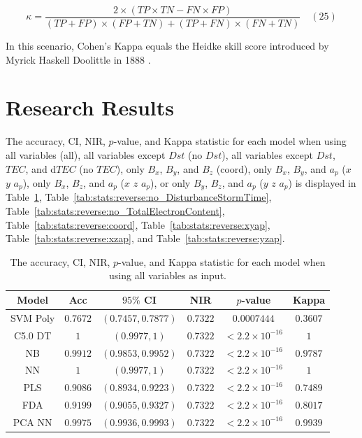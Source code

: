 \documentclass[sn-mathphys-num]{sn-jnl}%
\begin{document}
\begin{equation}
	\kappa ={\frac{2\times (TP\times TN-FN\times FP)}{(TP+FP)\times (FP+TN)+(TP+FN)\times (FN+TN)}}
	\quad\left(25\right)
\end{equation}

In this scenario, Cohen's Kappa equals the Heidke skill score introduced by Myrick Haskell Doolittle in 1888 \cite{heidke1926berechnung, philosophical1887bulletin}.

\section{Research Results}
\label{sec:Results}

The accuracy, CI, NIR, $p$-value, and Kappa statistic for each model when using all variables (all), all variables except $Dst$ (no $Dst$), all variables except $Dst$, $TEC$, and d$TEC$ (no $TEC$), only $B_{x}$, $B_{y}$, and $B_{z}$ (coord), only $B_{x}$, $B_{y}$, and $a_{p}$ ($x$ $y$ $a_{p}$), only $B_{x}$, $B_{z}$, and $a_{p}$ ($x$ $z$ $a_{p}$), or only $B_{y}$, $B_{z}$, and $a_{p}$ ($y$ $z$ $a_{p}$) is displayed in Table~\ref{tab:stats:reverse:all}, Table~\ref{tab:stats:reverse:no_DisturbanceStormTime}, Table~\ref{tab:stats:reverse:no_TotalElectronContent}, Table~\ref{tab:stats:reverse:coord}, Table~\ref{tab:stats:reverse:xyap}, Table~\ref{tab:stats:reverse:xzap}, and Table~\ref{tab:stats:reverse:yzap}.

\begin{table}[!ht]
    \centering
    \caption{The accuracy, CI, NIR, $p$-value, and Kappa statistic for each model when using all variables as input.}
	\label{tab:stats:reverse:all}
	\begin{tabular}{|c|c|c|c|c|c|}
		\hline
		Model & Acc & $95\%$ CI & NIR & $p$-value & Kappa \\ \hline
		SVM Poly & $0.7672$ & $(0.7457, 0.7877)$ & $0.7322$ & $0.0007444$ & $0.3607$ \\ \hline
		C5.0 DT & $1$ & $(0.9977, 1)$ & $0.7322$ & $< 2.2 \times {10}^{-16}$ & $1$ \\ \hline
		NB & $0.9912$ & $(0.9853, 0.9952)$ & $0.7322$ & $< 2.2 \times {10}^{-16}$ & $0.9787$ \\ \hline
		NN & $1$ & $(0.9977, 1)$ & $0.7322$ & $< 2.2 \times {10}^{-16}$ & $1$ \\ \hline
		PLS & $0.9086$ & $(0.8934, 0.9223)$ & $0.7322$ & $< 2.2 \times {10}^{-16}$ & $0.7489$ \\ \hline
		FDA & $0.9199$ & $(0.9055, 0.9327)$ & $0.7322$ & $< 2.2 \times {10}^{-16}$ & $0.8017$ \\ \hline
		PCA NN & $0.9975$ & $(0.9936, 0.9993)$ & $0.7322$ & $< 2.2 \times {10}^{-16}$ & $0.9939$ \\ \hline
	\end{tabular}
\end{table}
\end{document}
